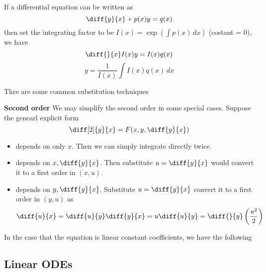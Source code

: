 \documentclass[11pt]{article}
\begin{document}
\begin{theorem}
  If a differential equation can be written as \[\diff{y}{x}+p(x)y=q(x)\] then set the integrating factor to be \(I(x)=\exp(\int p(x)\,dx)\) (costant = 0), we have 
  \[\diff{}{x}I(x)y=I(x)q(x)\]
  \[y=\frac{1}{I(x)}\int I(x)q(x)\,dx\]
\end{theorem}

Thre are some common substitution techniques 

\textbf{Second order}
We may simplify the second order in some special cases. Suppose the genearl explicit form 
\[\diff[2]{y}{x}=F(x,y,\diff{y}{x})\]
\begin{itemize}
  \item depends on only \(x\). Then we can simply integrate directly twice.
  \item depends on \(x,\diff{y}{x}\). Then substitute \(u=\diff{y}{x}\) would convert it to a first order in \((x,u)\).
  \item depends on \(y,\diff{y}{x}\). Substitute \(u=\diff{y}{x}\) convert it to a first order in \((y,u)\) as
  \[\diff{u}{x}=\diff{u}{y}\diff{y}{x}=u\diff{u}{y}=\diff{}{y}\left(\frac{u^2}{2}\right)\]
\end{itemize}

In the case that the equation is linear constant coefficients, we have the following
\begin{proposition}
  
\end{proposition}

\subsection{Linear ODEs}
\end{document}
